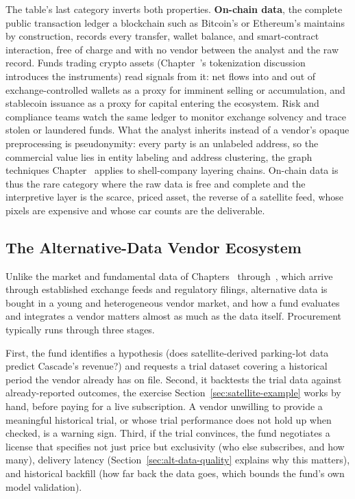 \documentclass[../ai_in_finance]{subfiles}
\begin{document}
The table's last category inverts both properties. \textbf{On-chain data}, the complete public transaction ledger a blockchain such as Bitcoin's or Ethereum's maintains by construction, records every transfer, wallet balance, and smart-contract interaction, free of charge and with no vendor between the analyst and the raw record. Funds trading crypto assets (Chapter~'s tokenization discussion introduces the instruments) read signals from it: net flows into and out of exchange-controlled wallets as a proxy for imminent selling or accumulation, and stablecoin issuance as a proxy for capital entering the ecosystem. Risk and compliance teams watch the same ledger to monitor exchange solvency and trace stolen or laundered funds. What the analyst inherits instead of a vendor's opaque preprocessing is pseudonymity: every party is an unlabeled address, so the commercial value lies in entity labeling and address clustering, the graph techniques Chapter~ applies to shell-company layering chains. On-chain data is thus the rare category where the raw data is free and complete and the interpretive layer is the scarce, priced asset, the reverse of a satellite feed, whose pixels are expensive and whose car counts are the deliverable.

\subsection{The Alternative-Data Vendor Ecosystem}
\label{sec:vendor-ecosystem}

Unlike the market and fundamental data of Chapters~ through~, which arrive through established exchange feeds and regulatory filings, alternative data is bought in a young and heterogeneous vendor market, and how a fund evaluates and integrates a vendor matters almost as much as the data itself. Procurement typically runs through three stages.

First, the fund identifies a hypothesis (does satellite-derived parking-lot data predict Cascade's revenue?) and requests a trial dataset covering a historical period the vendor already has on file. Second, it backtests the trial data against already-reported outcomes, the exercise Section~\ref{sec:satellite-example} works by hand, before paying for a live subscription. A vendor unwilling to provide a meaningful historical trial, or whose trial performance does not hold up when checked, is a warning sign. Third, if the trial convinces, the fund negotiates a license that specifies not just price but exclusivity (who else subscribes, and how many), delivery latency (Section~\ref{sec:alt-data-quality} explains why this matters), and historical backfill (how far back the data goes, which bounds the fund's own model validation).
\end{document}
